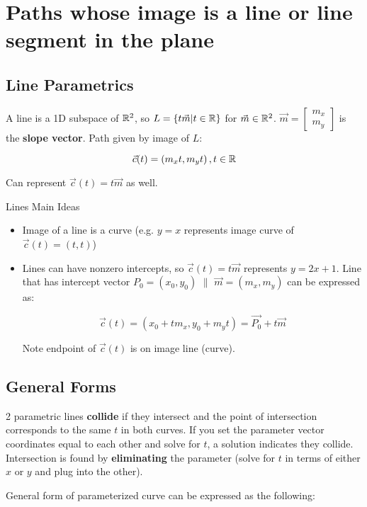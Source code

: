 \section{Paths whose image is a line or line segment in the plane}

\subsection{Line Parametrics}

A line is a 1D subspace of $\mathbb{R}^2$, so $L=\{t\vec{m}|t\in\mathbb{R}\}$ for $\vec{m}\in\mathbb{R}^2$.
$\vec{m}=\begin{bmatrix}m_x\\m_y\end{bmatrix}$ is the \textbf{slope vector}.
Path given by image of $L$: 

\[\vec{c}(t)=\left(m_{x} t, m_{y} t\right),t\in\mathbb{R}\]

Can represent $\vec{c}(t)=t\vec{m}$ as well.\newline

\noindent
Lines Main Ideas
\begin{itemize}
    \item Image of a line is a curve (e.g. $y=x$ represents image curve of $\vec{c}(t)=(t,t)$)
    \item Lines can have nonzero intercepts, so $\vec{c}(t)=t\vec{m}$ represents $y=2x+1$. Line
    that has intercept vector $P_0=(x_0,y_0)$ $\parallel$ $\vec{m}=(m_x,m_y)$ can be expressed as:

    \[\boxed{\vec{c}(t)=(x_0+tm_x, y_0+m_yt)=\vec{P_0}+t\vec{m}}\]

    Note endpoint of $\vec{c}(t)$ is on image line (curve).

\end{itemize}

\subsection{General Forms}

2 parametric lines \textbf{collide} if they intersect and the point of intersection corresponds
to the same $t$ in both curves. If you set the parameter vector coordinates equal to each
other and solve for $t$, a solution indicates they collide. Intersection is found by \textbf{eliminating}
the parameter (solve for $t$ in terms of either $x$ or $y$ and plug into the other).\newline

\noindent
General form of parameterized curve can be expressed as the following:

